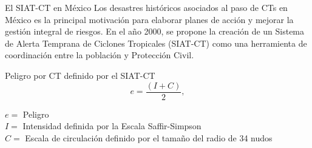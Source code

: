 \begin{frame}{El SIAT-CT en México}
    Los desastres históricos asociados al paso de CTs en México es la principal motivación para elaborar planes de acción y mejorar la gestión integral de riesgos. En el año 2000, se propone la creación de un Sistema de Alerta Temprana de Ciclones Tropicales (SIAT-CT) como una herramienta de coordinación entre la población y Protección Civil.

    \begin{block}{Peligro por CT definido por el SIAT-CT}
    \begin{equation}
    \label{eq:1.1}
       e = \displaystyle \frac{(I+C)}{2},
    \end{equation}
    
    $e = $ Peligro \\
    $I = $ Intensidad definida por la Escala Saffir-Simpson \\
    $C = $ Escala de circulación definido por el tamaño del radio de 34 nudos
    \\~\
    \end{block}
\end{frame}

